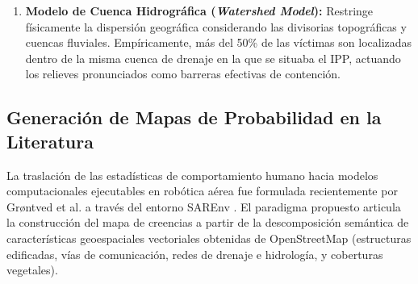 \begin{enumerate}
	\item \textbf{Modelo de Cuenca Hidrográfica (\textit{Watershed Model}):} 
	Restringe físicamente la dispersión geográfica considerando las divisorias topográficas y cuencas fluviales. Empíricamente, más del 50\% de las víctimas son localizadas dentro de la misma cuenca de drenaje en la que se situaba el IPP, actuando los relieves pronunciados como barreras efectivas de contención.
\end{enumerate}

\begin{table}[H]
	{\label{tab:isrid_perfiles_cap2}
	}
\end{table}

\subsection{Generación de Mapas de Probabilidad en la Literatura}

La traslación de las estadísticas de comportamiento humano hacia modelos computacionales ejecutables en robótica aérea fue formulada recientemente por Grøntved et al. a través del entorno SAREnv \cite{drones9090628}. El paradigma propuesto articula la construcción del mapa de creencias a partir de la descomposición semántica de características geoespaciales vectoriales obtenidas de OpenStreetMap (estructuras edificadas, vías de comunicación, redes de drenaje e hidrología, y coberturas vegetales). 


